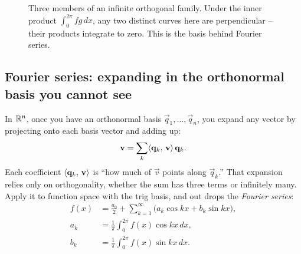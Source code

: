 \begin{figure}[H]
\centering
{}
\caption{Three members of an infinite orthogonal family. Under the inner product
$\int_0^{2\pi}fg\,dx$, any two distinct curves here are perpendicular -- their
products integrate to zero. This is the basis behind Fourier series.}
\label{ch37:fig-sincos}
\end{figure}

\subsection{Fourier series: expanding in the orthonormal basis you cannot see}
\label{ch37:fourier}

In $\mathbb{R}^n$, once you have an
orthonormal basis $\vec{q}_1,\dots,\vec{q}_n$, you expand any vector by projecting
onto each basis vector and adding up:
\[
  \mathbf{v} = \sum_{k} \langle \mathbf{q}_k,\, \mathbf{v} \rangle\,\mathbf{q}_k.
\]
Each coefficient $\langle \mathbf{q}_k,\, \mathbf{v} \rangle$ is ``how much of $\vec{v}$ points along
$\vec{q}_k$.'' That expansion relies only on orthogonality, whether the sum has
three terms or infinitely many. Apply it to function space with
the trig basis, and out drops the \emph{Fourier series}:
\begin{align*}
  f(x) &= \frac{a_0}{2} + \sum_{k=1}^{\infty}\Big(a_k\cos kx + b_k\sin kx\Big),\\
  a_k &= \frac{1}{\pi}\int_0^{2\pi} f(x)\cos kx\,dx,\\
  b_k &= \frac{1}{\pi}\int_0^{2\pi} f(x)\sin kx\,dx.
\end{align*}

